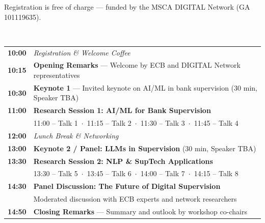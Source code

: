 \documentclass[a4paper,10pt]{article}
\newcommand{\sectiontitle}[1]{%
  \noindent{\LARGE\bfseries\color{confblue}#1}\\[-2pt]
  \noindent{\color{confgold}\rule{\linewidth}{2pt}}\par\vspace{3pt}%
}
\newcommand{\progtime}[1]{\textbf{\color{confdark}#1}}
\newcommand{\progsession}[1]{\textbf{\color{confblue}#1}}
\newcommand{\progbreak}[1]{\textit{\color{gray}#1}}
\begin{document}
\vspace{4pt}
{\centering\small\color{gray} Registration is free of charge --- funded by the MSCA DIGITAL Network (GA 101119635).\par}

\clearpage


\sectiontitle{Program at a Glance}

\noindent{}

\vspace{4pt}

\renewcommand{\arraystretch}{1.3}
\noindent\begin{tabularx}{\textwidth}{@{}>{\raggedright}p{2.4cm} X@{}}
\toprule
\progtime{10:00} & \progbreak{Registration \& Welcome Coffee}\\
\progtime{10:15} & \progsession{Opening Remarks} --- Welcome by ECB and DIGITAL Network representatives\\
\rowcolor{confgold!12}
\progtime{10:30} & \progsession{Keynote 1} --- Invited keynote on AI/ML in bank supervision (30 min, Speaker TBA)\\
\progtime{11:00} & \progsession{Research Session 1: AI/ML for Bank Supervision}\\
& {\small\color{confdark} 11:00 -- Talk 1 \,$\cdot$\, 11:15 -- Talk 2 \,$\cdot$\, 11:30 -- Talk 3 \,$\cdot$\, 11:45 -- Talk 4}\\
\rowcolor{confgray!50}
\progtime{12:00} & \progbreak{Lunch Break \& Networking}\\
\rowcolor{confgold!12}
\progtime{13:00} & \progsession{Keynote 2 / Panel: LLMs in Supervision} (30 min, Speaker TBA)\\
\progtime{13:30} & \progsession{Research Session 2: NLP \& SupTech Applications}\\
& {\small\color{confdark} 13:30 -- Talk 5 \,$\cdot$\, 13:45 -- Talk 6 \,$\cdot$\, 14:00 -- Talk 7 \,$\cdot$\, 14:15 -- Talk 8}\\
\rowcolor{confgold!12}
\progtime{14:30} & \progsession{Panel Discussion: The Future of Digital Supervision}\\
& {\small\color{confdark} Moderated discussion with ECB experts and network researchers}\\
\progtime{14:50} & \progsession{Closing Remarks} --- Summary and outlook by workshop co-chairs\\
\bottomrule
\end{tabularx}
\renewcommand{\arraystretch}{1.0}
\end{document}
